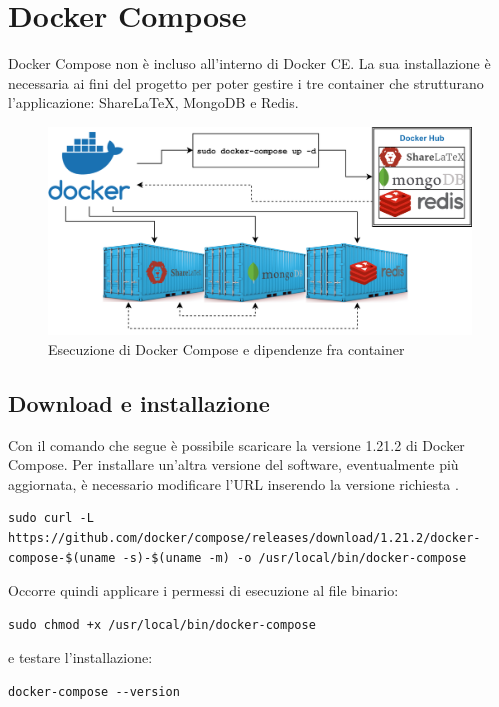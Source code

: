 \section{Docker Compose}
Docker Compose non è incluso all'interno di Docker CE. La sua installazione è necessaria ai fini del progetto per poter gestire i tre container che strutturano l'applicazione: ShareLaTeX, MongoDB e Redis.
\begin{figure}[h]
    \centering
    \includegraphics[width=\textwidth]{immagini/docker_container_dependencies.png}
    \caption{Esecuzione di Docker Compose e dipendenze fra container}
    \label{fig:docker_compose_dipendenze}
\end{figure}

\subsection{Download e installazione}
Con il comando che segue è possibile scaricare la versione 1.21.2 di Docker Compose. Per installare un'altra versione del software, eventualmente più aggiornata, è necessario modificare l'URL inserendo la versione richiesta \cite{docker_compose_release}.
\begin{lstlisting}
sudo curl -L https://github.com/docker/compose/releases/download/1.21.2/docker-compose-$(uname -s)-$(uname -m) -o /usr/local/bin/docker-compose
\end{lstlisting}
Occorre quindi applicare i permessi di esecuzione al file binario:
\begin{lstlisting}
sudo chmod +x /usr/local/bin/docker-compose
\end{lstlisting}
e testare l'installazione:
\begin{lstlisting}
docker-compose --version
\end{lstlisting}


